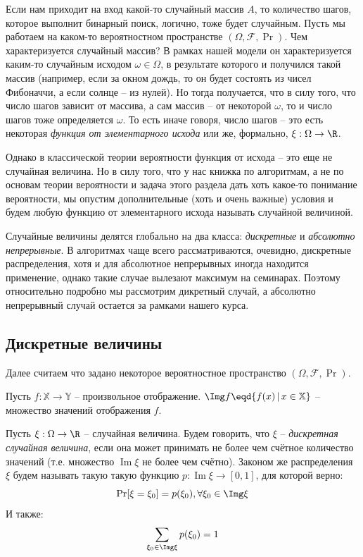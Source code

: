 Если нам приходит на вход какой-то случайный массив $A$, то количество шагов, которое выполнит бинарный поиск, логично, тоже будет случайным.
Пусть мы работаем на каком-то вероятностном пространстве $(\Omega, \mathcal{F}, \Pr)$. Чем характеризуется случайный массив? В рамках нашей модели он характеризуется каким-то случайным исходом $\omega \in \Omega$, в результате которого и получился такой массив (например, если за окном дождь, то он будет состоять из чисел Фибоначчи, а если солнце -- из нулей).
Но тогда получается, что в силу того, что число шагов зависит от массива, а сам массив -- от некоторой $\omega$, то и число шагов тоже определяется $\omega$. То есть иначе говоря, число шагов -- это есть некоторая \textit{функция от элементарного исхода} или же, формально, $\xi: \Omega \to \R$.

Однако в классической теории вероятности функция от исхода -- это еще не случайная величина. Но в силу того, что у нас книжка по алгоритмам, а не по основам теории вероятности и задача этого раздела дать хоть какое-то понимание вероятности, мы опустим дополнительные (хоть и очень важные) условия и будем любую функцию от элементарного исхода называть случайной величиной.

Случайные величины делятся глобально на два класса: \textit{дискретные} и \textit{абсолютно непрерывные}. В алгоритмах чаще всего рассматриваются, очевидно, дискретные распределения, хотя и для абсолютное непрерывных иногда находится применение, однако такие случае вылезают максимум на семинарах. Поэтому относительно подробно мы рассмотрим дикретный случай, а абсолютно непрерывный случай остается за рамками нашего курса.

\subsection{Дискретные величины}

Далее считаем что задано некоторое вероятностное пространство $(\Omega, \mathcal{F}, \Pr)$.

\Def Пусть $f: \mathbb{X} \to \mathbb{Y}$ -- произвольное отображение. $\Img f \eqd \{ f(x) \, | \, x \in \mathbb{X} \}$ -- множество значений отображения $f$.

\Def Пусть $\xi: \Omega \to \R$ -- случайная величина. Будем говорить, что $\xi$ -- \textit{дискретная случайная величина}, если она может принимать не более чем счётное количество значений (т.е. множество $\operatorname{Im} \xi$ не более чем счётно). Законом же распределения $\xi$ будем называть такую такую функцию $p: \operatorname{Im} \xi \to [0, 1]$, для которой верно:
\begin{equation*}
    \Pr[\xi = \xi_0] = p(\xi_0), \forall \xi_0 \in \Img \xi
\end{equation*}
И также:
\begin{equation*}
    \sum\limits_{\xi_0 \in \Img \xi} p(\xi_0) = 1
\end{equation*}

